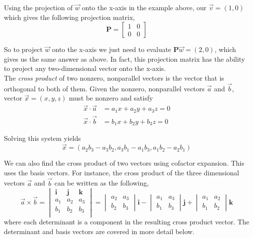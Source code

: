 \documentclass[12pt]{article}
\begin{document}
Using the projection of $\vec{w}$ onto the x-axis in the example above, our $\vec{v}=(1,0)$ which gives the following projection matrix,
\[
\mathbf{P} =
\begin{bmatrix}
1 & 0 \\
0 & 0
\end{bmatrix}
\]

So to project $\vec{w}$ onto the x-axis we just need to evaluate $\mathbf{P}\vec{w}=(2,0)$, which gives us the same answer as above. In fact, this projection matrix has the ability to project any two-dimensional vector onto the x-axis.\\

The \emph{cross product} of two nonzero, nonparallel vectors is the vector that is orthogonal to both of them. Given the nonzero, nonparallel vectors $\vec{a}$ and $\vec{b}$, vector $\vec{x}=(x,y,z)$ must be nonzero and satisfy
\begin{align*}
\vec{x}\cdot\vec{a} &= a_1x+a_2y+a_3z = 0 \\
\vec{x}\cdot\vec{b} &= b_1x+b_2y+b_3z = 0
\end{align*}

 Solving this system yields
\[
\vec{x} = (a_2b_3-a_3b_2, a_3b_1-a_1b_3, a_1b_2-a_2b_1)
\]

 We can also find the cross product of two vectors using cofactor expansion. This uses the basis vectors. For instance, the cross product of the three dimensional vectors $\vec{a}$ and $\vec{b}$ can be written as the following,
\[
\vec{a}\times\vec{b} = 
\begin{vmatrix}
\mathbf{i} & \mathbf{j} & \mathbf{k} \\
 a_1 & a_2 & a_3 \\
 b_1 & b_2 & b_3 \\
\end{vmatrix}
=
\begin{vmatrix}
a_2 & a_3 \\
b_2 & b_3
\end{vmatrix}
\mathbf{i}
-
\begin{vmatrix}
a_1 & a_3 \\
b_1 & b_3
\end{vmatrix}
\mathbf{j}
+
\begin{vmatrix}
a_1 & a_2 \\
b_1 & b_2
\end{vmatrix}
\mathbf{k}
\]
where each determinant is a component in the resulting cross product vector. The determinant and basis vectors are covered in more detail below.\\
\end{document}
